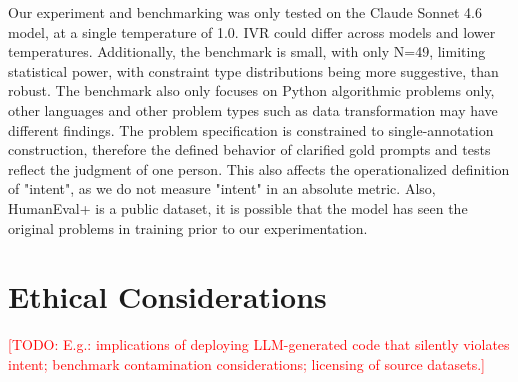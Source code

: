 \documentclass[11pt]{article}
\newcommand{\todo}[1]{\textcolor{red}{[TODO: #1]}}
\begin{document}
Our experiment and benchmarking was only tested on the Claude Sonnet 4.6 model, at a single temperature of 1.0. IVR could differ across models and lower temperatures. Additionally, the benchmark is small, with only N=49, limiting statistical power, with constraint type distributions being more suggestive, than robust. The benchmark also only focuses on Python algorithmic problems only, other languages and other problem types such as data transformation may have different findings. The problem specification is constrained to single-annotation construction, therefore the defined behavior of clarified gold prompts and tests reflect the judgment of one person. This also affects the operationalized definition of "intent", as we do not measure "intent" in an absolute metric. Also, HumanEval+ is a public dataset, it is possible that the model has seen the original problems in training prior to our experimentation. 

\section*{Ethical Considerations}
\todo{E.g.: implications of deploying LLM-generated code that silently violates intent; benchmark contamination considerations; licensing of source datasets.}




\appendix
\end{document}
